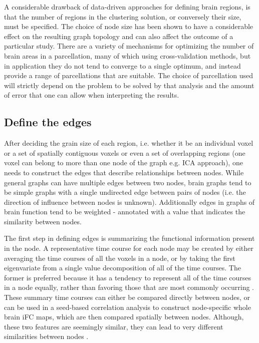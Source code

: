 A considerable drawback of data-driven approaches for defining brain regions, is that the number of regions in the clustering solution, or conversely their size, must be specified. The choice of node size has been shown to have a considerable effect on the resulting graph topology \cite{Zalesky} and can also affect the outcome of a particular study\cite{Cecci_2009}. There are a variety of mechanisms for optimizing the number of brain areas in a parcellation, many of which using cross-validation methods, but in application they do not tend to converge to a single optimum, and instead provide a range of parcellations that are suitable\cite{craddock2012}. The choice of parcellation used will strictly depend on the problem to be solved by that analysis and the amount of error that one can allow when interpreting the results. 

\subsection*{Define the edges}
After deciding the grain size of each region, i.e. whether it be an individual voxel or a set of spatially contiguous voxels or even a set of overlapping regions (one voxel can belong to more than one node of the graph e.g. ICA approach), one needs to construct the edges that describe relationships between nodes. While general graphs can have multiple edges between two nodes, brain graphs tend to be simple graphs with a single undirected edge between pairs of nodes (i.e. the direction of influence between nodes is unknown). Additionally edges in graphs of brain function tend to be weighted - annotated with a value that indicates the similarity between nodes. 

The first step in defining edges is summarizing the functional information present in the node. A representative time course for each node may be created by either averaging the time courses of all the voxels in a node, or by taking the first eigenvariate from a single value decomposition of all of the time courses\cite{friston_functional_localizers}. The former is preferred because it has a tendency to represent all of the time courses in a node equally, rather than favoring those that are most commonly occurring \cite{craddock2012}. These summary time courses can either be compared directly between nodes, or can be used in a seed-based correlation analysis to construct node-specific whole brain iFC maps, which are then compared spatially between nodes. Although, these two features are seemingly similar, they can lead to very different similarities between nodes \cite{craddock2012}. 

